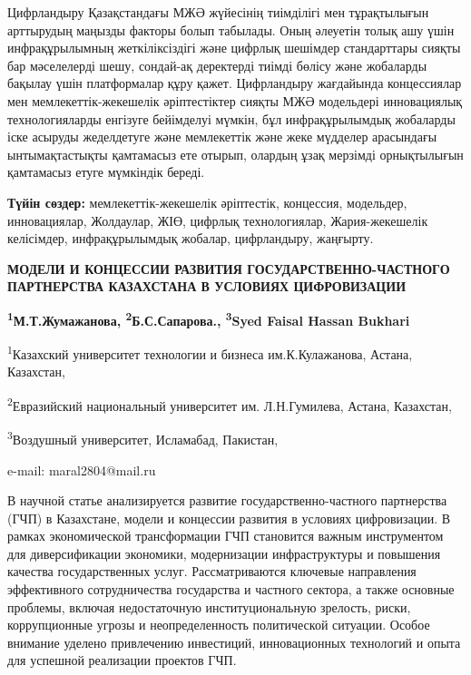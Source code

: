 Цифрландыру Қазақстандағы МЖӘ жүйесінің тиімділігі мен тұрақтылығын
арттырудың маңызды факторы болып табылады. Оның әлеуетін толық ашу үшін
инфрақұрылымның жеткіліксіздігі және цифрлық шешімдер стандарттары
сияқты бар мәселелерді шешу, сондай-ақ деректерді тиімді бөлісу және
жобаларды бақылау үшін платформалар құру қажет. Цифрландыру жағдайында
концессиялар мен мемлекеттік-жекешелік әріптестіктер сияқты МЖӘ
модельдері инновациялық технологияларды енгізуге бейімделуі мүмкін, бұл
инфрақұрылымдық жобаларды іске асыруды жеделдетуге және мемлекеттік және
жеке мүдделер арасындағы ынтымақтастықты қамтамасыз ете отырып, олардың
ұзақ мерзімді орнықтылығын қамтамасыз етуге мүмкіндік береді.

{\bfseries Түйін сөздер:} мемлекеттік-жекешелік әріптестік, концессия,
модельдер, инновациялар, Жолдаулар, ЖІӨ, цифрлық технологиялар,
Жария-жекешелік келісімдер, инфрақұрылымдық жобалар, цифрландыру,
жаңғырту.

\begin{articleheader}
{\bfseries МОДЕЛИ И КОНЦЕССИИ РАЗВИТИЯ ГОСУДАРСТВЕННО-ЧАСТНОГО ПАРТНЕРСТВА КАЗАХСТАНА В УСЛОВИЯХ ЦИФРОВИЗАЦИИ}

{\bfseries
\textsuperscript{1}М.Т.Жумажанова\textsuperscript{\envelope },
\textsuperscript{2}Б.С.Сапарова.,
\textsuperscript{3}Syed Faisal Hassan Bukhari
}
\end{articleheader}

\begin{articleheader}
\textsuperscript{1}Казахский университет технологии и бизнеса им.К.Кулажанова, Астана, Казахстан,

\textsuperscript{2}Евразийский национальный университет им. Л.Н.Гумилева, Астана, Казахстан,

\textsuperscript{3}Воздушный университет, Исламабад, Пакистан,

e-mail: maral2804@mail.ru
\end{articleheader}

В научной статье анализируется развитие государственно-частного
партнерства (ГЧП) в Казахстане, модели и концессии развития в условиях
цифровизации. В рамках экономической трансформации ГЧП становится важным
инструментом для диверсификации экономики, модернизации инфраструктуры и
повышения качества государственных услуг. Рассматриваются ключевые
направления эффективного сотрудничества государства и частного сектора,
а также основные проблемы, включая недостаточную институциональную
зрелость, риски, коррупционные угрозы и неопределенность политической
ситуации. Особое внимание уделено привлечению инвестиций, инновационных
технологий и опыта для успешной реализации проектов ГЧП.

